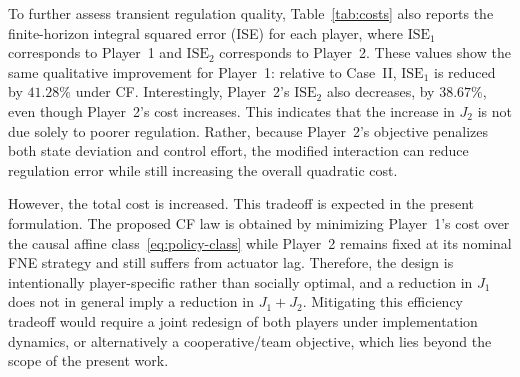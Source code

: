 \documentclass[letterpaper, 10 pt, conference]{ieeeconf}  %
\begin{document}
To further assess transient regulation quality, Table~\ref{tab:costs} also reports the finite-horizon integral squared error (ISE) for each player, where $\mathrm{ISE}_1$ corresponds to Player~1 and $\mathrm{ISE}_2$ corresponds to Player~2. These values show the same qualitative improvement for Player~1: relative to Case~II, $\mathrm{ISE}_1$ is reduced by $41.28\%$ under CF. Interestingly, Player~2's $\mathrm{ISE}_2$ also decreases, by $38.67\%$, even though Player~2's cost increases. This indicates that the increase in $J_2$ is not due solely to poorer regulation. Rather, because Player~2's objective penalizes both state deviation and control effort, the modified interaction can reduce regulation error while still increasing the overall quadratic cost.

However, the total cost is increased. This tradeoff is expected in the present formulation. The proposed CF law is obtained by minimizing Player~1's cost over the causal affine class~\eqref{eq:policy-class} while Player~2 remains fixed at its nominal FNE strategy and still suffers from actuator lag. Therefore, the design is intentionally player-specific rather than socially optimal, and a reduction in $J_1$ does not in general imply a reduction in $J_1+J_2$. Mitigating this efficiency tradeoff would require a joint redesign of both players under implementation dynamics, or alternatively a cooperative/team objective, which lies beyond the scope of the present work.




\end{document}
